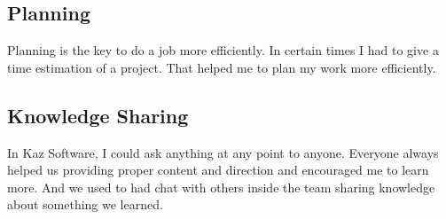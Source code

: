 \subsection{Planning}

Planning is the key to do a job more efficiently.
In certain times I had to give a time estimation of a project.
That helped me to plan my work more efficiently.

\subsection{Knowledge Sharing}

In Kaz Software, I could ask anything at any point to anyone.
Everyone always helped us providing proper content and direction and encouraged me to learn more.
And we used to had chat with others inside the team sharing knowledge about something we learned.

